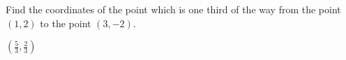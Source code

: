
\begin{Exercise}[
name={},
title={}, 
difficulty=0,
origin={\cite{SM}}]
Find the coordinates of the point which is one third of the way from the point $(1,2)$ to the point $(3,-2)$.

\end{Exercise}

\begin{Answer}
$\left(\frac{5}{3},\frac{2}{3}\right)$

\end{Answer}
